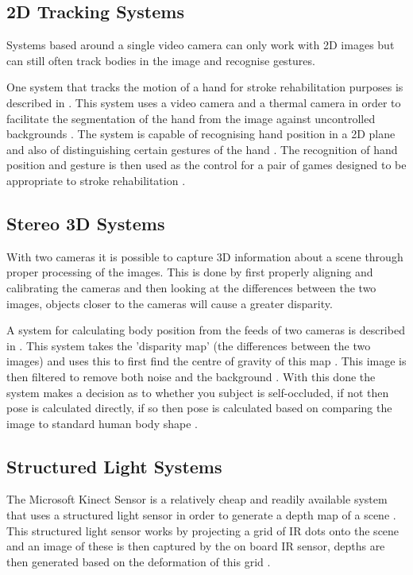 \documentclass[journal]{IEEEtran}
\begin{document}
\subsection{2D Tracking Systems}
Systems based around a single video camera can only work with 2D images but can still often track 
bodies in the image and recognise gestures.

One system that tracks the motion of a hand for stroke rehabilitation purposes is described in \cite{SeriousGames}. 
This system uses a video camera and a thermal camera in order to facilitate the segmentation of the hand from the 
image against uncontrolled backgrounds \cite{SeriousGames}. The system is capable of recognising hand position 
in a 2D plane and also of distinguishing certain gestures of the hand \cite{SeriousGames}. The recognition 
of hand position and gesture is then used as the control for a pair of games designed to be appropriate to 
stroke rehabilitation \cite{SeriousGames}.

\subsection{Stereo 3D Systems}
With two cameras it is possible to capture 3D information about a scene through proper processing of the 
images. This is done by first properly aligning and calibrating the cameras and then looking at the differences 
between the two images, objects closer to the cameras will cause a greater disparity.

A system for calculating body position from the feeds of two cameras is described in \cite{StereoCamera}. This 
system takes the 'disparity map' (the differences between the two images) and uses this to first find 
the centre of gravity of this map \cite{StereoCamera}. This image is then filtered to remove both noise 
and the background \cite{StereoCamera}. With this done the system makes a decision as to whether 
you subject is self-occluded, if not then pose is calculated directly, if so then pose is calculated 
based on comparing the image to standard human body shape \cite{StereoCamera}.

\subsection{Structured Light Systems}
The Microsoft Kinect Sensor is a relatively cheap and readily available system that uses a structured 
light sensor in order to generate a depth map of a scene \cite{Kinect}. This structured light sensor 
works by projecting a grid of IR dots onto the scene and an image of these is then captured by the 
on board IR sensor, depths are then generated based on the deformation of this grid \cite{Kinect}.
\end{document}
